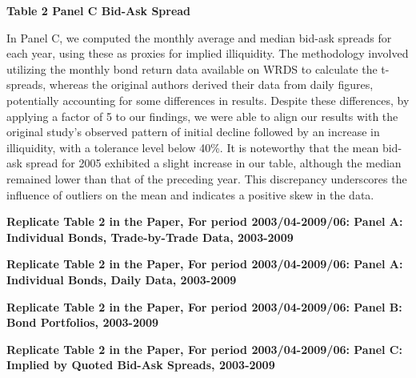 \documentclass{article}
\newcommand*{\PathToOutput}{../output/}%
\begin{document}
\textbf{\large Table 2 Panel C Bid-Ask Spread}

In Panel C, we computed the monthly average and median bid-ask spreads for each year, using these as proxies for implied illiquidity. The methodology involved utilizing the monthly bond return data available on WRDS to calculate the t-spreads, whereas the original authors derived their data from daily figures, potentially accounting for some differences in results. Despite these differences, by applying a factor of 5 to our findings, we were able to align our results with the original study's observed pattern of initial decline followed by an increase in illiquidity, with a tolerance level below 40\%. It is noteworthy that the mean bid-ask spread for 2005 exhibited a slight increase in our table, although the median remained lower than that of the preceding year. This discrepancy underscores the influence of outliers on the mean and indicates a positive skew in the data.



\doublespacing
\begin{table}[hbt!]
\centering
\textbf{\large Replicate Table 2 in the Paper, For period 2003/04-2009/06: Panel A: Individual Bonds, Trade-by-Trade Data, 2003-2009}

\label{table:table2_panelA_trade_by_trade_paper}
\end{table}

\begin{table}[hbt!]
\centering
\textbf{\large Replicate Table 2 in the Paper, For period 2003/04-2009/06: Panel A: Individual Bonds, Daily Data, 2003-2009}

\label{table:table2_panelA_daily_paper}
\end{table}

\begin{table}[hbt!]
\centering
\textbf{\large Replicate Table 2 in the Paper, For period 2003/04-2009/06: Panel B: Bond Portfolios, 2003-2009}

\label{table:table2_panelB_paper}
\end{table}

\begin{table}[hbt!]
\centering
\textbf{\large Replicate Table 2 in the Paper, For period 2003/04-2009/06: Panel C: Implied by Quoted Bid-Ask Spreads, 2003-2009}

\label{table:table2_panelC_paper}
\end{table}
\end{document}
